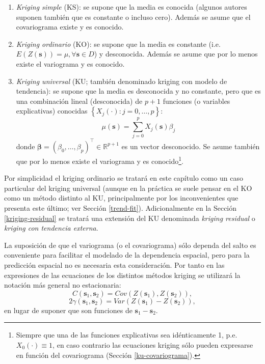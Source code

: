 \documentclass[
  spanish,
]{book}
\theoremstyle{break}
\theoremstyle{definition}
\theoremstyle{definition}
\theoremstyle{definition}
\theoremstyle{definition}
\theoremstyle{remark}
\begin{document}
\begin{enumerate}
\def\labelenumi{\arabic{enumi}.}
\item
  \emph{Kriging simple} (KS): se supone que la media es conocida (algunos autores suponen también que es constante o incluso cero).
  Además se asume que el covariograma existe y es conocido.
\item
  \emph{Kriging ordinario} (KO): se supone que la media es constante (i.e.~\(E(Z(\mathbf{s}))=\mu ,\forall \mathbf{s}\in D\)) y desconocida.
  Además se asume que por lo menos existe el variograma y es conocido.
\item
  \emph{Kriging universal} (KU; también denominado kriging con modelo de tendencia): se supone que la media es desconocida y no constante, pero
  que es una combinación lineal (desconocida) de \(p+1\) funciones (o variables explicativas) conocidas \(\left\{ X_{j} (\cdot):j=0, \ldots,p\right\}\):
  \[\mu(\mathbf{s})=\sum\limits_{j=0}^{p}X_{j} (\mathbf{s})\beta_{j}\]
  donde \(\boldsymbol{\beta}=(\beta_{0}, \ldots, \beta_{p} )^\top \in \mathbb{R}^{p+1}\) es un vector desconocido.
  Se asume también que por lo menos existe el variograma y es conocido\footnote{Siempre que una de las funciones explicativas sea idénticamente 1, p.e. \(X_{0} (\cdot)\equiv 1\), en caso contrario las ecuaciones kriging sólo pueden expresarse en función del covariograma (Sección \ref{ku-covariograma}).}.
\end{enumerate}

Por simplicidad el kriging ordinario se tratará en este capítulo como un caso particular del kriging universal (aunque en la práctica se suele pensar en el KO como un método distinto al KU, principalmente por los inconvenientes que presenta este último; ver Sección \ref{trend-fit}).
Adicionalmente en la Sección \ref{kriging-residual} se tratará una extensión del KU denominada \emph{kriging residual} o \emph{kriging con tendencia externa}.

La suposición de que el variograma (o el covariograma) sólo dependa del salto es conveniente para facilitar el modelado de la dependencia espacial, pero para la predicción espacial no es necesaria esta consideración.
Por tanto en las expresiones de las ecuaciones de los distintos métodos kriging se utilizará la notación más general no estacionaria:
\[C(\mathbf{s}_{1}, \mathbf{s}_{2}) = Cov(Z(\mathbf{s}_{1}), Z(\mathbf{s}_{2})),\]
\[2\gamma(\mathbf{s}_{1}, \mathbf{s}_{2}) = Var(Z(\mathbf{s}_{1}) - Z(\mathbf{s}_{2})),\]
en lugar de suponer que son funciones de \(\mathbf{s}_{1}-\mathbf{s}_{2}\).
\end{document}
